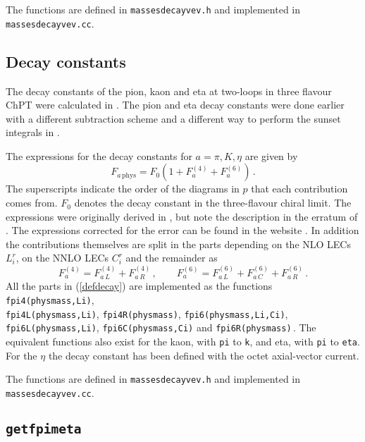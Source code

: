\documentclass[12pt,a4paper]{article}
\begin{document}
The functions are defined in \texttt{massesdecayvev.h} and
implemented in \texttt{massesdecayvev.cc}.

\subsection{Decay constants}

The decay constants of the pion, kaon and eta at two-loops in three flavour ChPT
were calculated in \cite{Amoros:1999dp}. The pion and eta decay constants
were done earlier
with a different subtraction scheme and a different way to perform the
sunset integrals in \cite{Golowich:1997zs}.

The expressions for the decay constants for $a=\pi,K,\eta$ are given by
\begin{equation}
\label{defdecayfirst}
F_{a\,\mathrm{phys}} = F_0\left(1+F_a^{(4)}+F_a^{(6)}\right)\,.
\end{equation}
The superscripts indicate the order of the diagrams in $p$ that each
contribution comes from. $F_0$ denotes the decay constant in the three-flavour
chiral limit.
The expressions were originally derived
in \cite{Amoros:1999dp},
but note the description in the erratum of \cite{Amoros:2000mc}.
The expressions corrected for the error can be found in the website
\cite{webpage}.
In addition the contributions themselves are split in the parts
depending on the NLO LECs $L_i^r$, on the NNLO LECs $C_i^r$ and the
remainder as
\begin{equation}
\label{defdecay}
F_a^{(4)}=F_{a\,L}^{(4)}+F_{a\,R}^{(4)}\,,
\qquad
F_a^{(6)}=F_{a\,L}^{(6)}+F_{a\,C}^{(6)}+F_{a\,R}^{(6)}\,.
\end{equation}
All the parts in (\ref{defdecay}) are implemented as the functions
\texttt{fpi4(physmass,Li)},\\ \texttt{fpi4L(physmass,Li)}, 
\texttt{fpi4R(physmass)}, \texttt{fpi6(physmass,Li,Ci)},
\texttt{fpi6L(physmass,Li)}, \texttt{fpi6C(physmass,Ci)}
and \texttt{fpi6R(physmass)}\,. The equivalent functions also exist 
for the kaon, with \texttt{pi} to \texttt{k}, and eta,
with \texttt{pi} to \texttt{eta}. For the $\eta$ the decay constant has been
defined with the octet axial-vector current.

The functions are defined in \texttt{massesdecayvev.h} and
implemented in \texttt{massesdecayvev.cc}.

\subsection{\texttt{getfpimeta}}
\end{document}
